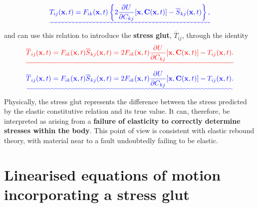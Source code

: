 \documentclass [a4paper,12pt]{paper}
\providecommand{\DIFadd}[1]{{\protect\color{blue}\uwave{#1}}} %
\providecommand{\DIFdel}[1]{{\protect\color{red}\sout{#1}}}                      %
\providecommand{\DIFaddbegin}{} %
\providecommand{\DIFaddend}{} %
\providecommand{\DIFdelbegin}{} %
\providecommand{\DIFdelend}{} %
\begin{document}
\DIFdelend \DIFaddbegin \DIFadd{~(\ref{eq:10}) implies
}\begin{equation}\DIFadd{\label{eq:11}
T_{ij}(\mathbf{x}, t) = F_{ik}(\mathbf{x}, t)\left\{2\frac{\partial U}{\partial C_{kj}}[\mathbf{x}, \mathbf{C}(\mathbf{x}, t)] - 
\overline{S}_{kj}(\mathbf{x}, t)\right\},
}\end{equation}\DIFaddend 
and \DIFaddbegin \DIFadd{we }\DIFaddend can use this relation to introduce the \textbf{stress glut}, $\overline{T}_{ij}$, through the identity
\DIFdelbegin \begin{displaymath}
\DIFdel{\overline{T}_{ij}(\mathbf{x}, t) = F_{ik}(\mathbf{x}, t)\overline{S}_{kj}(\mathbf{x}, t) = 2F_{ik}(\mathbf{x}, t)
\frac{\partial U}{\partial C_{kj}}[\mathbf{x}, \mathbf{C}(\mathbf{x}, t)] - T_{ij}(\mathbf{x}, t).
}\end{displaymath}%
\DIFdelend \DIFaddbegin \begin{equation}\DIFadd{\label{eq:12}
\overline{T}_{ij}(\mathbf{x}, t) = F_{ik}(\mathbf{x}, t)\overline{S}_{kj}(\mathbf{x}, t) = 2F_{ik}(\mathbf{x}, t)
\frac{\partial U}{\partial C_{kj}}[\mathbf{x}, \mathbf{C}(\mathbf{x}, t)] - T_{ij}(\mathbf{x}, t).
}\end{equation}\DIFaddend 
Physically, the stress glut represents the difference between the stress predicted by the elastic constitutive relation 
and its true value. It can, therefore, be interpreted as arising 
from a \textbf{failure of elasticity to correctly determine stresses within the body}. This point of view is consistent with 
elastic rebound theory, with material near to a fault undoubtedly failing to be elastic.

\section*{Linearised equations of motion incorporating a stress glut}
\end{document}
